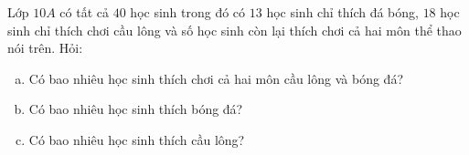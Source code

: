    \begin{bt}%
	Lớp $10A$ có tất cả $40$ học sinh trong đó có $13$ học sinh chỉ thích đá bóng, $18$ học sinh chỉ thích chơi cầu lông và số học sinh còn lại thích chơi cả hai môn thể thao nói trên. Hỏi:	
	\begin{enumerate}[a)]
		\item Có bao nhiêu học sinh thích chơi cả hai môn cầu lông và bóng đá?
		\item Có bao nhiêu học sinh thích bóng đá?
		\item Có bao nhiêu học sinh thích cầu lông?
	\end{enumerate}
\end{bt}

